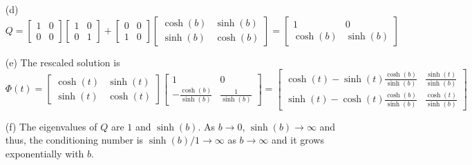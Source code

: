 \documentclass[10pt]{article}
\begin{document}
\begin{itemize}
\item[(d)]$$Q = \begin{bmatrix}
1 & 0 \\
0 & 0
\end{bmatrix} \begin{bmatrix}
1 & 0 \\
0 & 1
\end{bmatrix} + \begin{bmatrix}
0 & 0 \\
1 & 0
\end{bmatrix} \begin{bmatrix}
\cosh(b) & \sinh(b) \\
\sinh(b) & \cosh(b)
\end{bmatrix} = \begin{bmatrix}
1 & 0 \\
\cosh(b) & \sinh(b)
\end{bmatrix} $$

\item[(e)] The rescaled solution is $$
\Phi(t) = \begin{bmatrix}
\cosh(t) & \sinh(t) \\
\sinh(t) & \cosh(t)
\end{bmatrix} \begin{bmatrix}
1 & 0 \\
-\frac{ \cosh(b)}{\sinh(b)} & \frac{1}{\sinh(b)}  \end{bmatrix} = \begin{bmatrix}
\cosh(t) - \sinh(t) \frac{\cosh(b)}{\sinh(b)} & \frac{\sinh(t)}{\sinh(b)} \\
\sinh(t) - \cosh(t)  \frac{\cosh(b)}{\sinh(b)} & \frac{\cosh(t)}{\sinh(b)} 
\end{bmatrix}
$$

\item[(f)] The eigenvalues of $Q$ are $ 1$ and $ \sinh(b) $. As $ b \to 0 $, $ \sinh(b) \to \infty $ and thus, the conditioning number is $ \sinh(b) /1 \to \infty $ as $ b \to \infty $ and it grows exponentially with $b$.

\end{itemize}

\newpage

\end{document}
